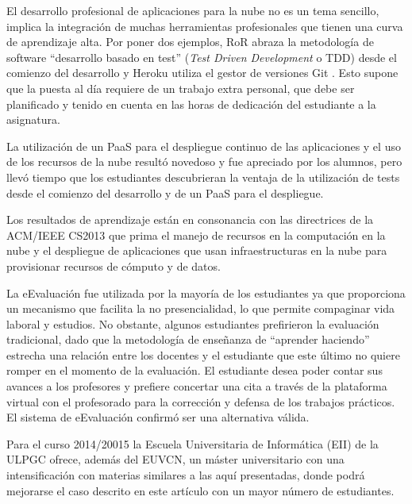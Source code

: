 \documentclass[conference]{IEEEtran}
\begin{document}
El desarrollo profesional de aplicaciones para la nube no es un tema sencillo,
implica la integración de muchas herramientas profesionales que tienen una
curva de aprendizaje alta. Por poner dos ejemplos, RoR abraza la metodología de software 
``desarrollo basado en test'' (\textit{Test Driven Development} o TDD) \cite{Rappin:2010} 
desde el comienzo del desarrollo y Heroku utiliza el gestor de versiones Git \cite{Chacon:2009}. 
Esto supone que la puesta al día requiere de un trabajo extra personal, que debe ser planificado 
y tenido en cuenta en las horas de dedicación del estudiante a la asignatura. 

La utilización de un PaaS para el despliegue continuo de las aplicaciones y el uso de los 
recursos de la nube resultó novedoso y fue apreciado por los alumnos, pero llevó tiempo 
que los estudiantes descubrieran la ventaja de la utilización de tests desde el comienzo 
del desarrollo y de un PaaS para el despliegue.

Los resultados de aprendizaje están en consonancia con las directrices de la ACM/IEEE CS2013 
que prima el manejo de recursos en la computación en la nube y el despliegue de aplicaciones 
que usan infraestructuras en la nube para provisionar recursos de cómputo y de datos.

La eEvaluación fue utilizada por la mayoría de los estudiantes ya que proporciona un mecanismo que 
facilita la no presencialidad, lo que permite compaginar vida laboral y estudios. No obstante, 
algunos estudiantes prefirieron la evaluación tradicional, dado que la metodología de enseñanza 
de ``aprender haciendo'' estrecha una relación entre los docentes y el estudiante que este último 
no quiere romper en el momento de la evaluación. El estudiante desea poder contar sus avances a 
los profesores y prefiere concertar una cita a través de la plataforma virtual con el profesorado 
para la corrección y defensa de los trabajos prácticos. El sistema de eEvaluación confirmó ser una 
alternativa válida.

Para el curso 2014/20015 la Escuela Universitaria de Informática (EII) de la ULPGC ofrece, además 
del EUVCN, un máster universitario con una intensificación con materias similares a las aquí presentadas,
donde podrá mejorarse el caso descrito en este artículo con un mayor número de estudiantes.

 



                                                            
\end{document}
